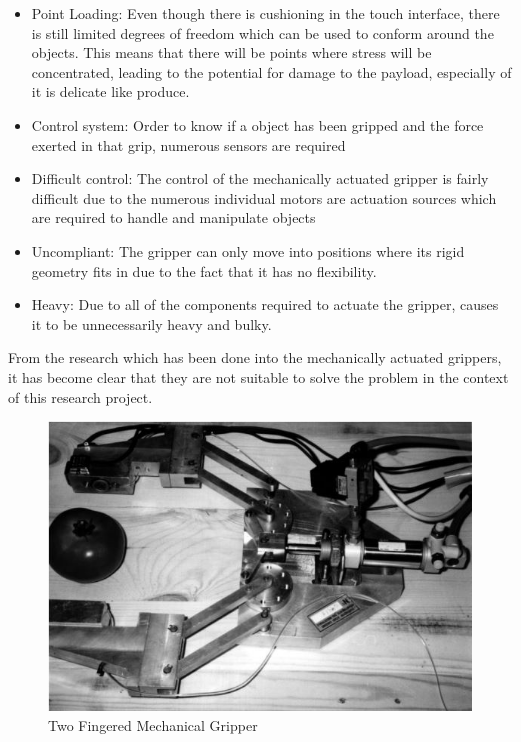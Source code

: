 \documentclass[11pt,twocolumn]{article}
\begin{document}
\begin{itemize}
\item Point Loading: Even though there is cushioning in the touch interface, there is still limited degrees of freedom which can be used to conform around the objects. This means that there will be points where stress will be concentrated, leading to the potential for damage to the payload, especially of it is delicate like produce.
\item Control system: Order to know if a object has been gripped and the force exerted in that grip, numerous sensors are required \cite{chiu2013development}
\item Difficult control: The control of the mechanically actuated gripper is fairly difficult due to the numerous individual motors are actuation sources which are required to handle and manipulate objects \cite{marchese2015recipe}
\item Uncompliant: The gripper can only move into positions where its rigid geometry fits in due to the  fact that it has no flexibility.
\item Heavy: Due to all of the components required to actuate the gripper, causes it to be unnecessarily heavy and bulky.
\end{itemize}
From the research which has been done into the mechanically actuated grippers, it has become clear that they are not suitable to solve the  problem in the context of this research project. 
\begin{figure}[h]
\centering
\includegraphics[scale=0.6]{Mechanical1}
\caption{Two Fingered Mechanical Gripper}
\label{fig:Mechanical1}
\end{figure}
\end{document}
